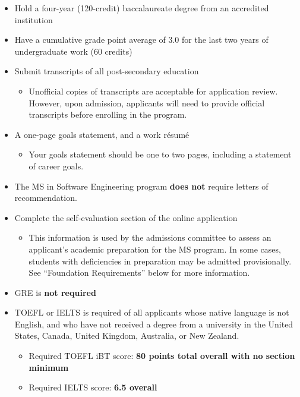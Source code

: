 \documentclass[oneside,11pt]{memoir}
\begin{document}
\begin{itemize}
    \item Hold a four-year (120-credit) baccalaureate degree from an accredited institution
    \item Have a cumulative grade point average of 3.0 for the last two years of undergraduate work (60 credits)
    \item Submit transcripts of all post-secondary education
        \begin{itemize}
            \item Unofficial copies of transcripts are acceptable for application review. However, upon admission, applicants will need to provide official transcripts before enrolling in the program.
        \end{itemize}
    \item A one-page goals statement, and a work résumé
        \begin{itemize}
            \item Your goals statement should be one to two pages, including a statement of career goals.
        \end{itemize}
    \item The MS in Software Engineering program \textbf{does not} require letters of recommendation.
    \item Complete the self-evaluation section of the online application
    \begin{itemize}
        \item This information is used by the admissions committee to assess an applicant’s academic preparation for the MS program. In some cases, students with deficiencies in preparation may be admitted provisionally. See “Foundation Requirements” below for more information.
        \end{itemize}
    \item GRE is \textbf{not required}
    \item TOEFL or IELTS is required of all applicants whose native language is not English, and who have not received a degree from a university in the United States, Canada, United Kingdom, Australia, or New Zealand.
    \begin{itemize}
        \item Required TOEFL iBT score: \textbf{80 points total overall with no section minimum}
        \item Required IELTS score: \textbf{6.5 overall}
    \end{itemize}
\end{itemize}
\end{document}
